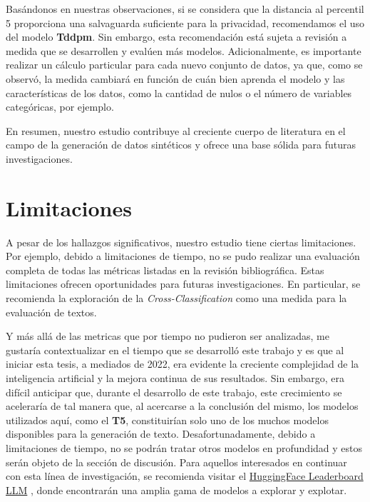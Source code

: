 Basándonos en nuestras observaciones, si se considera que la distancia al percentil 5 proporciona una salvaguarda suficiente para la privacidad, recomendamos el uso del modelo \textbf{Tddpm}. Sin embargo, esta recomendación está sujeta a revisión a medida que se desarrollen y evalúen más modelos. Adicionalmente, es importante realizar un cálculo particular para cada nuevo conjunto de datos, ya que, como se observó, la medida cambiará en función de cuán bien aprenda el modelo y las características de los datos, como la cantidad de nulos o el número de variables categóricas, por ejemplo.



En resumen, nuestro estudio contribuye al creciente cuerpo de literatura en el campo de la generación de datos sintéticos y ofrece una base sólida para futuras investigaciones.


\section{Limitaciones}
A pesar de los hallazgos significativos, nuestro estudio tiene ciertas limitaciones. Por ejemplo, debido a limitaciones de tiempo, no se pudo realizar una evaluación completa de todas las métricas listadas en la revisión bibliográfica. Estas limitaciones ofrecen oportunidades para futuras investigaciones. En particular, se recomienda la exploración de la \emph{Cross-Classification} como una medida para la evaluación de textos.

Y más allá de las metricas que por tiempo no pudieron ser analizadas, me gustaría contextualizar en el tiempo que se desarrolló este trabajo y es que al iniciar esta tesis, a mediados de 2022, era evidente la creciente complejidad de la inteligencia artificial y la mejora continua de sus resultados. Sin embargo, era difícil anticipar que, durante el desarrollo de este trabajo, este crecimiento se aceleraría de tal manera que, al acercarse a la conclusión del mismo, los modelos utilizados aquí, como el \textbf{T5}, constituirían solo uno de los muchos modelos disponibles para la generación de texto. Desafortunadamente, debido a limitaciones de tiempo, no se podrán tratar otros modelos en profundidad y estos serán objeto de la sección de discusión. Para aquellos interesados en continuar con esta línea de investigación, se recomienda visitar el \href{https://huggingface.co/spaces/HuggingFaceH4/open_llm_leaderboard}{HuggingFace Leaderboard LLM} \cite{noauthor_open_nodate}, donde encontrarán una amplia gama de modelos a explorar y explotar.

